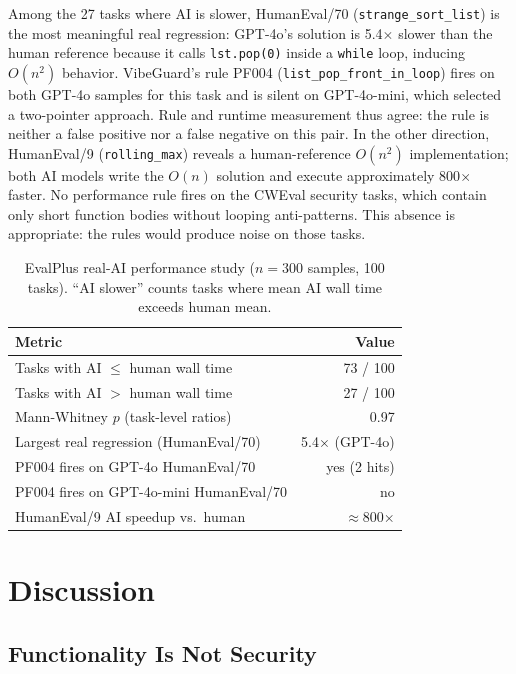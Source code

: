 \documentclass[sigconf,nonacm]{acmart}
\begin{document}
Among the 27 tasks where AI is slower, HumanEval/70 (\texttt{strange\_sort\_list})
is the most meaningful real regression: GPT-4o's solution is 5.4$\times$
slower than the human reference because it calls \texttt{lst.pop(0)} inside a
\texttt{while} loop, inducing $O(n^2)$ behavior. VibeGuard's rule PF004
(\texttt{list\_pop\_front\_in\_loop}) fires on both GPT-4o samples for this
task and is silent on GPT-4o-mini, which selected a two-pointer approach. Rule
and runtime measurement thus agree: the rule is neither a false positive nor
a false negative on this pair. In the other direction, HumanEval/9
(\texttt{rolling\_max}) reveals a human-reference $O(n^2)$ implementation;
both AI models write the $O(n)$ solution and execute approximately 800$\times$
faster. No performance rule fires on the CWEval security tasks, which contain
only short function bodies without looping anti-patterns. This absence is
appropriate: the rules would produce noise on those tasks.

\begin{table}[t]
\caption{EvalPlus real-AI performance study ($n=300$ samples, 100 tasks).
``AI slower'' counts tasks where mean AI wall time exceeds human mean.}
\label{tab:perf-evalplus}
\centering
\small
\begin{tabular}{lr}
\toprule
Metric & Value \\
\midrule
Tasks with AI $\leq$ human wall time & 73 / 100 \\
Tasks with AI $>$ human wall time & 27 / 100 \\
Mann-Whitney $p$ (task-level ratios) & 0.97 \\
Largest real regression (HumanEval/70) & 5.4$\times$ (GPT-4o) \\
PF004 fires on GPT-4o HumanEval/70 & yes (2 hits) \\
PF004 fires on GPT-4o-mini HumanEval/70 & no \\
HumanEval/9 AI speedup vs.\ human & $\approx$800$\times$ \\
\bottomrule
\end{tabular}
\end{table}

\section{Discussion}

\subsection{Functionality Is Not Security}
\end{document}
